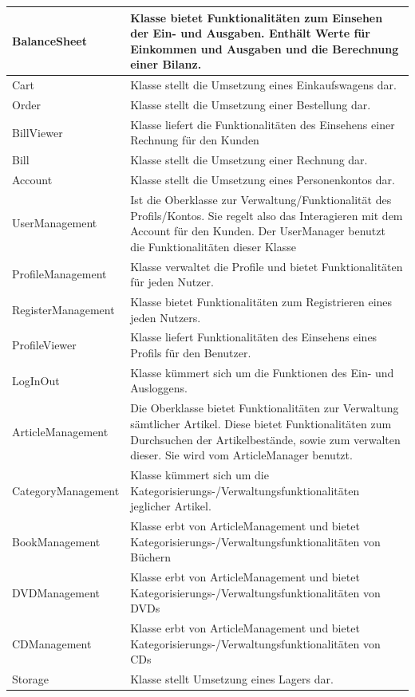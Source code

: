 \documentclass[a4paper]{article}
\begin{document}
\begin{longtable}{|p{100px}|p{250px}|}
	BalanceSheet & Klasse bietet Funktionalitäten zum Einsehen der Ein- und Ausgaben. Enthält Werte für Einkommen und Ausgaben und die Berechnung einer Bilanz. \\ \hline
	Cart & Klasse stellt die Umsetzung eines Einkaufswagens dar. \\ \hline
	Order & Klasse stellt die Umsetzung einer Bestellung dar. \\ \hline
	BillViewer & Klasse liefert die Funktionalitäten des Einsehens einer Rechnung für den Kunden \\ \hline
	Bill & Klasse stellt die Umsetzung einer Rechnung dar. \\ \hline
	Account	 & Klasse stellt die Umsetzung eines Personenkontos dar. \\ \hline
	UserManagement  & Ist die Oberklasse zur Verwaltung/Funktionalität des Profils/Kontos. Sie regelt also das Interagieren mit dem Account für den Kunden. Der UserManager benutzt die Funktionalitäten dieser Klasse \\ \hline
	ProfileManagement & Klasse verwaltet die Profile und bietet Funktionalitäten für jeden Nutzer. \\ \hline
	RegisterManagement & Klasse bietet Funktionalitäten zum Registrieren eines jeden Nutzers. \\ \hline
	ProfileViewer & Klasse liefert Funktionalitäten des Einsehens eines Profils für den Benutzer. \\ \hline
	LogInOut & Klasse kümmert sich um die Funktionen des Ein- und Ausloggens. \\ \hline
	ArticleManagement & Die Oberklasse bietet Funktionalitäten zur Verwaltung sämtlicher Artikel. Diese bietet Funktionalitäten zum Durchsuchen der Artikelbestände, sowie zum verwalten dieser. Sie wird vom ArticleManager benutzt. \\ \hline
	CategoryManagement & Klasse kümmert sich um die Kategorisierungs-/Verwaltungsfunktionalitäten jeglicher Artikel. \\ \hline
	BookManagement & Klasse erbt von ArticleManagement und  bietet  Kategorisierungs-/Verwaltungsfunktionalitäten von Büchern \\ \hline
	DVDManagement & Klasse erbt von ArticleManagement und  bietet  Kategorisierungs-/Verwaltungsfunktionalitäten von DVDs \\ \hline
	CDManagement & Klasse erbt von ArticleManagement und  bietet  Kategorisierungs-/Verwaltungsfunktionalitäten von CDs \\ \hline
	Storage & Klasse stellt Umsetzung eines Lagers dar. \\ \hline

\end{longtable}
\end{document}
